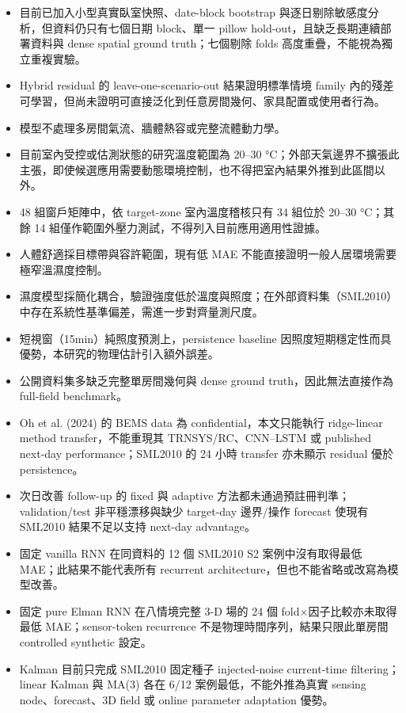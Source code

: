 \documentclass[12pt,a4paper]{article}
\begin{document}
\begin{itemize}
\item 目前已加入小型真實臥室快照、date-block bootstrap 與逐日剔除敏感度分析，但資料仍只有七個日期 block、單一 pillow hold-out，且缺乏長期連續部署資料與 dense spatial ground truth；七個剔除 folds 高度重疊，不能視為獨立重複實驗。
\item Hybrid residual 的 leave-one-scenario-out 結果證明標準情境 family 內的殘差可學習，但尚未證明可直接泛化到任意房間幾何、家具配置或使用者行為。
\item 模型不處理多房間氣流、牆體熱容或完整流體動力學。
\item 目前室內受控或估測狀態的研究溫度範圍為 20–30 °C；外部天氣邊界不擴張此主張，即使候選應用需要動態環境控制，也不得把室內結果外推到此區間以外。
\item 48 組窗戶矩陣中，依 target-zone 室內溫度稽核只有 34 組位於 20–30 °C；其餘 14 組僅作範圍外壓力測試，不得列入目前應用適用性證據。
\item 人體舒適採目標帶與容許範圍，現有低 MAE 不能直接證明一般人居環境需要極窄溫濕度控制。
\item 濕度模型採簡化耦合，驗證強度低於溫度與照度；在外部資料集（SML2010）中存在系統性基準偏差，需進一步對齊量測尺度。
\item 短視窗（15min）純照度預測上，persistence baseline 因照度短期穩定性而具優勢，本研究的物理估計引入額外誤差。
\item 公開資料集多缺乏完整單房間幾何與 dense ground truth，因此無法直接作為 full-field benchmark。
\item Oh et al. (2024) 的 BEMS data 為 confidential，本文只能執行 ridge-linear method transfer，不能重現其 TRNSYS/RC、CNN--LSTM 或 published next-day performance；SML2010 的 24 小時 transfer 亦未顯示 residual 優於 persistence。
\item 次日改善 follow-up 的 fixed 與 adaptive 方法都未通過預註冊判準；validation/test 非平穩漂移與缺少 target-day 邊界/操作 forecast 使現有 SML2010 結果不足以支持 next-day advantage。
\item 固定 vanilla RNN 在同資料的 12 個 SML2010 S2 案例中沒有取得最低 MAE；此結果不能代表所有 recurrent architecture，但也不能省略或改寫為模型改善。
\item 固定 pure Elman RNN 在八情境完整 3-D 場的 24 個 fold×因子比較亦未取得最低 MAE；sensor-token recurrence 不是物理時間序列，結果只限此單房間 controlled synthetic 設定。
\item Kalman 目前只完成 SML2010 固定種子 injected-noise current-time filtering；linear Kalman 與 MA(3) 各在 6/12 案例最低，不能外推為真實 sensing node、forecast、3D field 或 online parameter adaptation 優勢。

\end{itemize}
\end{document}
